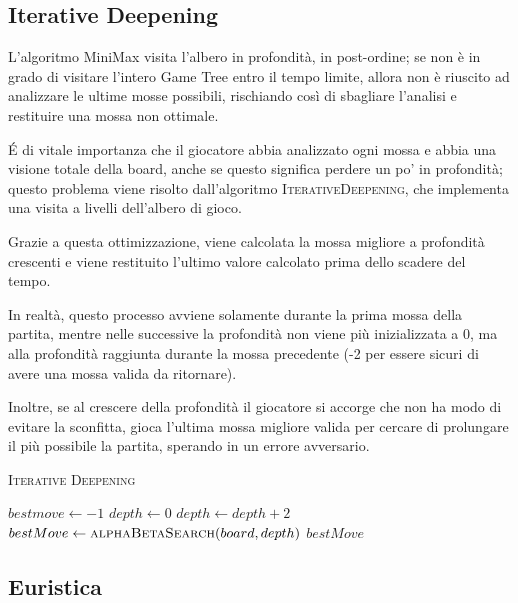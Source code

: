 \documentclass{article}
\begin{document}
\pagebreak

\subsection{Iterative Deepening}

L'algoritmo MiniMax visita l'albero in profondità, in post-ordine; se non è in grado di visitare
l'intero Game Tree entro il tempo limite, allora non è riuscito ad analizzare le ultime mosse possibili,
rischiando così di sbagliare l'analisi e restituire una mossa non ottimale.

\'E di vitale importanza che il giocatore abbia analizzato ogni mossa e abbia una visione totale della 
board, anche se questo significa perdere un po' in profondità; questo problema viene risolto
dall'algoritmo \textsc{IterativeDeepening}, che implementa una visita a livelli dell'albero di gioco.

Grazie a questa ottimizzazione, viene calcolata la mossa migliore a profondità crescenti e viene
restituito l'ultimo valore calcolato prima dello scadere del tempo.

In realtà, questo processo avviene solamente durante la prima mossa della partita, mentre nelle successive
la profondità non viene più inizializzata a $0$, ma alla profondità raggiunta durante la mossa
precedente (-2 per essere sicuri di avere una mossa valida da ritornare).

Inoltre, se al crescere della profondità il giocatore si accorge che non ha modo di evitare la sconfitta,
gioca l'ultima mossa migliore valida per cercare di prolungare il più possibile la partita, sperando
in un errore avversario.

\begin{algorithm}[H]
  \caption{\textsc{Iterative Deepening}}
  \label{alg:itdeepening}
  \begin{algorithmic}
      \State $bestmove \gets -1$
      \State $depth \gets 0$
        \State $depth \gets depth + 2$
        \State $bestMove \gets \Call{alphaBetaSearch}{board,depth}$
      \EndWhile
      \State \Return $bestMove$
    \EndProcedure
  \end{algorithmic}
\end{algorithm}

\pagebreak

\subsection{Euristica}
\end{document}
